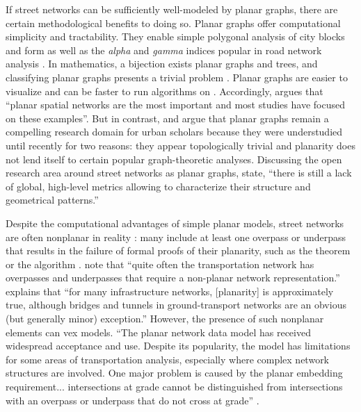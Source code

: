 \documentclass[Afour,sageh,times]{sagej}
\begin{document}
If street networks can be sufficiently well-modeled by planar graphs, there are certain methodological benefits to doing so. Planar graphs offer computational simplicity and tractability. They enable simple polygonal analysis of city blocks and form \citep{fohl_non-planar_1996,barthelemy_paths_2017} as well as the \emph{alpha} and \emph{gamma} indices popular in road network analysis \citep{eppstein_studying_2008}. In mathematics, a bijection exists planar graphs and trees, and classifying planar graphs presents a trivial problem \citep{louf_typology_2014}. Planar graphs are easier to visualize and can be faster to run algorithms on \citep{liebers_planarizing_2001}. Accordingly, \citet[p.~3]{barthelemy_spatial_2011} argues that \enquote{planar spatial networks are the most important and most studies have focused on these examples}. But in contrast, \citet{masucci_random_2009} and \citet{masucci_limited_2013} argue that planar graphs remain a compelling research domain for urban scholars because they were understudied until recently for two reasons: they appear topologically trivial and planarity does not lend itself to certain popular graph-theoretic analyses. Discussing the open research area around street networks as planar graphs, \citet[p.~1]{viana_simplicity_2013} state, \enquote{there is still a lack of global, high-level metrics allowing to characterize their structure and geometrical patterns.}

Despite the computational advantages of simple planar models, street networks are often nonplanar in reality \citep[p.~7]{levinson_network_2012}: many include at least one overpass or underpass that results in the failure of formal proofs of their planarity, such as the \citet{kuratowski_sur_1930} theorem or the \cite{hopcroft_efficient_1974} algorithm \citep[cf.][]{gastner_spatial_2006}. \citet[p.~199]{jiang_object-oriented_2010} note that \enquote{quite often the transportation network has overpasses and underpasses that require a non-planar network representation.} \citet[p.~1258]{fischer_spatial_2014} explains that \enquote{for many infrastructure networks, {[planarity]} is approximately true, although bridges and tunnels in ground-transport networks are an obvious (but generally minor) exception.} However, the presence of such nonplanar elements can vex models. \enquote{The planar network data model has received widespread acceptance and use. Despite its popularity, the model has limitations for some areas of transportation analysis, especially where complex network structures are involved. One major problem is caused by the planar embedding requirement... intersections at grade cannot be distinguished from intersections with an overpass or underpass that do not cross at grade} \citep[p.~395]{fischer_gis_2004}.
\end{document}
